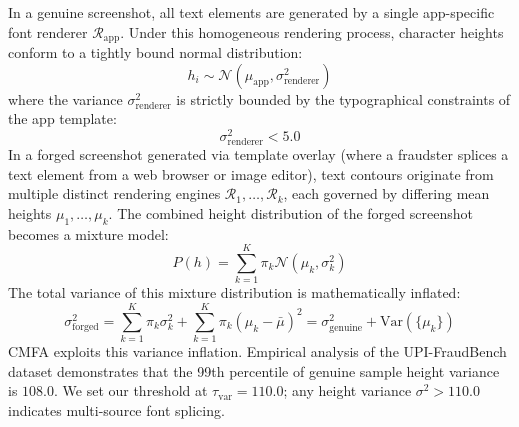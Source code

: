 In a genuine screenshot, all text elements are generated by a single app-specific font renderer $\mathcal{R}_{\text{app}}$. Under this homogeneous rendering process, character heights conform to a tightly bound normal distribution:
\begin{equation}
    h_i \sim \mathcal{N}(\mu_{\text{app}}, \sigma^2_{\text{renderer}})
\end{equation}
where the variance $\sigma^2_{\text{renderer}}$ is strictly bounded by the typographical constraints of the app template:
\begin{equation}
    \sigma^2_{\text{renderer}} < 5.0
\end{equation}
In a forged screenshot generated via template overlay (where a fraudster splices a text element from a web browser or image editor), text contours originate from multiple distinct rendering engines $\mathcal{R}_1, \dots, \mathcal{R}_k$, each governed by differing mean heights $\mu_1, \dots, \mu_k$. The combined height distribution of the forged screenshot becomes a mixture model:
\begin{equation}
    P(h) = \sum_{k=1}^K \pi_k \mathcal{N}(\mu_k, \sigma^2_k)
\end{equation}
The total variance of this mixture distribution is mathematically inflated:
\begin{equation}
    \sigma^2_{\text{forged}} = \sum_{k=1}^K \pi_k \sigma^2_k + \sum_{k=1}^K \pi_k (\mu_k - \bar{\mu})^2 = \sigma^2_{\text{genuine}} + \text{Var}(\{\mu_k\})
\end{equation}
CMFA exploits this variance inflation. Empirical analysis of the UPI-FraudBench dataset demonstrates that the 99th percentile of genuine sample height variance is $108.0$. We set our threshold at $\tau_{\text{var}} = 110.0$; any height variance $\sigma^2 > 110.0$ indicates multi-source font splicing.

